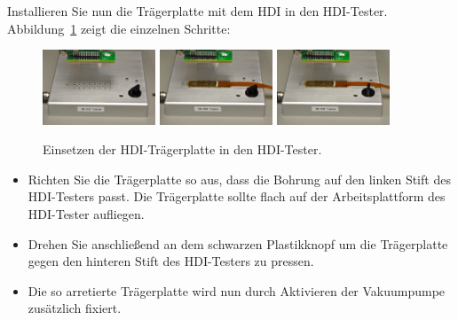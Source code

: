 \documentclass[a4paper,12pt,pointlessnumbers]{scrartcl}
\begin{document}
Installieren Sie nun die Tr{\"a}gerplatte mit dem HDI in den HDI-Tester.
Abbildung~\ref{fig:mounting} zeigt die einzelnen Schritte:
\begin{figure}[h]
\centering
  \includegraphics[width=0.3\textwidth]{figures/mounting1.jpg}
  \includegraphics[width=0.3\textwidth]{figures/mounting2.jpg}
  \includegraphics[width=0.3\textwidth]{figures/mounting3.jpg}
 \caption{Einsetzen der HDI-Tr{\"a}gerplatte in den HDI-Tester.}
 \label{fig:mounting}
\end{figure}
\begin{itemize}
\item Richten Sie die Tr{\"a}gerplatte so aus, dass die Bohrung auf den linken Stift des HDI-Testers passt.
Die Tr{\"a}gerplatte sollte flach auf der Arbeitsplattform des HDI-Tester aufliegen.
\item Drehen Sie anschlie{\ss}end an dem schwarzen Plastikknopf um die Tr{\"a}gerplatte gegen den hinteren Stift des HDI-Testers zu pressen.
\item Die so arretierte Tr{\"a}gerplatte wird nun durch Aktivieren der Vakuumpumpe zus{\"a}tzlich fixiert.
\end{itemize}
\end{document}
